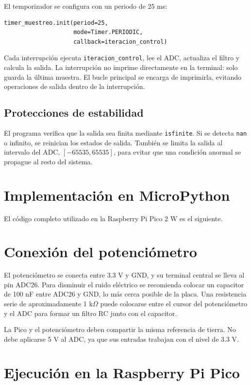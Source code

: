 \documentclass[12pt, letterpaper]{article}
\begin{document}
El temporizador se configura con un periodo de 25 ms:
\begin{lstlisting}[style=pythonstyle]
timer_muestreo.init(period=25,
					mode=Timer.PERIODIC,
					callback=iteracion_control)
\end{lstlisting}

Cada interrupción ejecuta \texttt{iteracion\_control}, lee el ADC, actualiza el
filtro y calcula la salida. La interrupción no imprime directamente en la
terminal: solo guarda la última muestra. El bucle principal se encarga de
imprimirla, evitando operaciones de salida dentro de la interrupción.

\subsection{Protecciones de estabilidad}

El programa verifica que la salida sea finita mediante \texttt{isfinite}. Si se
detecta \texttt{nan} o infinito, se reinician los estados de salida. También se
limita la salida al intervalo del ADC, $[-65535,65535]$, para evitar que una
condición anormal se propague al resto del sistema.

\section{Implementación en MicroPython}

El código completo utilizado en la Raspberry Pi Pico 2 W es el siguiente.



\section{Conexión del potenciómetro}

El potenciómetro se conecta entre 3.3 V y GND, y su terminal central se lleva
al pin ADC26. Para disminuir el ruido eléctrico se recomienda colocar un
capacitor de 100 nF entre ADC26 y GND, lo más cerca posible de la placa. Una
resistencia serie de aproximadamente 1 k$\Omega$ puede colocarse entre el
cursor del potenciómetro y el ADC para formar un filtro RC junto con el
capacitor.

La Pico y el potenciómetro deben compartir la misma referencia de tierra. No
debe aplicarse 5 V al ADC, ya que sus entradas trabajan con el nivel de 3.3 V.

\section{Ejecución en la Raspberry Pi Pico}
\end{document}
